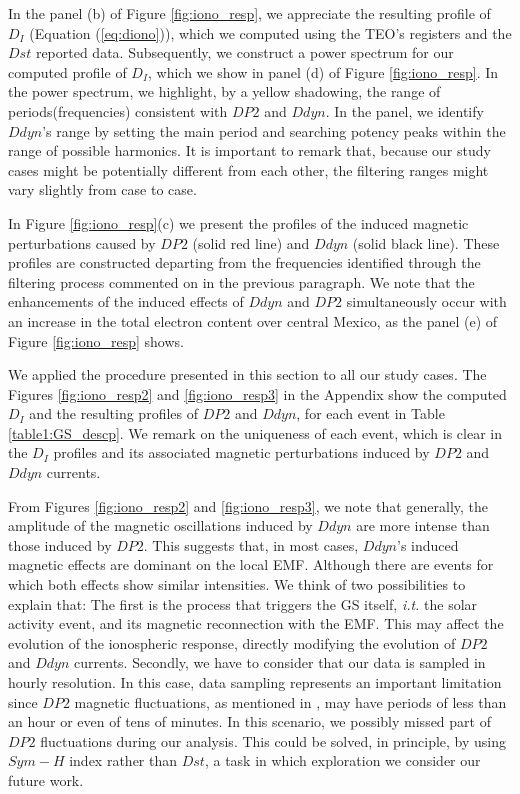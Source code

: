 \documentclass[a4paper,fleqn]{cas-dc}
\begin{document}
In the panel (b) of Figure \ref{fig:iono_resp}, we appreciate the resulting profile of $D_I$ (Equation (\ref{eq:diono})), which we computed using the TEO's registers and the $Dst$ reported data. Subsequently, we construct a power spectrum for our computed profile of $D_I$, which we show in panel (d) of Figure \ref{fig:iono_resp}. In the power spectrum, we highlight, by a yellow shadowing, the range of periods(frequencies) consistent with $DP2$ and $Ddyn$. In the panel, we identify $Ddyn$'s range by setting the main period and searching potency peaks within the range of possible harmonics. It is important to remark that, because our study cases might be potentially different from each other, the filtering ranges might vary slightly from case to case.

In Figure \ref{fig:iono_resp}(c) we present the profiles of the induced magnetic perturbations caused by $DP2$ (solid red line) and $Ddyn$ (solid black line). These profiles are constructed departing from the frequencies identified through the filtering process commented on in the previous paragraph. We note that the enhancements of the induced effects of $Ddyn$ and $DP2$ simultaneously occur with an increase in the total electron content over central Mexico, as the panel (e) of Figure \ref{fig:iono_resp} shows.
 
We applied the procedure presented in this section to all our study cases. The Figures \ref{fig:iono_resp2} and \ref{fig:iono_resp3} in the Appendix show the computed $D_I$ and the resulting profiles of $DP2$ and $Ddyn$, for each event in Table \ref{table1:GS_descp}. We remark on the uniqueness of each event, which is clear in the $D_I$ profiles and its associated magnetic perturbations induced by $DP2$ and $Ddyn$ currents.

From Figures \ref{fig:iono_resp2} and \ref{fig:iono_resp3}, we note that generally, the amplitude of the magnetic oscillations induced by $Ddyn$ are more intense than those induced by $DP2$. This suggests that, in most cases, $Ddyn$'s induced magnetic effects are dominant on the local EMF. Although there are events for which both effects show similar intensities. We think of two possibilities to explain that: The first is the process that triggers the GS itself, \emph{i.t.} the solar activity event, and its magnetic reconnection with the EMF. This may affect the evolution of the ionospheric response, directly modifying the evolution of $DP2$ and $Ddyn$ currents. Secondly, we have to consider that our data is sampled in hourly resolution. In this case, data sampling represents an important limitation since $DP2$ magnetic fluctuations, as mentioned in \cite{nishida_68_fluctuations}, may have periods of less than an hour or even of tens of minutes. In this scenario, we possibly missed part of $DP2$ fluctuations during our analysis. This could be solved, in principle, by using $Sym-H$ index rather than $Dst$, a task in which exploration we consider our future work.
\end{document}

